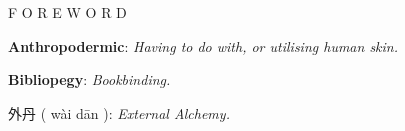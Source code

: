 \documentclass[12pt]{article}
\begin{document}
\begingroup
\begin{center}
\end{center}
\endgroup

\vspace{18\baselineskip}

\begingroup
\begin{center}
\huge F O R E W O R D
\end{center}
\endgroup

\vspace{3\baselineskip}

\begingroup
\begin{center}
\textbf{Anthropodermic}: \textit{Having to do with, or utilising human skin.}
\end{center}
\endgroup

\begingroup
\begin{center}
\textbf{Bibliopegy}: \textit{Bookbinding.}
\end{center}
\endgroup
 
 \begingroup
\begin{center}
 {\setmainfont{Source Han Serif SC Bold}\selectfont 外丹 ( wài dān ):} \textit{External Alchemy.}
\end{center}
\endgroup
\end{document}
